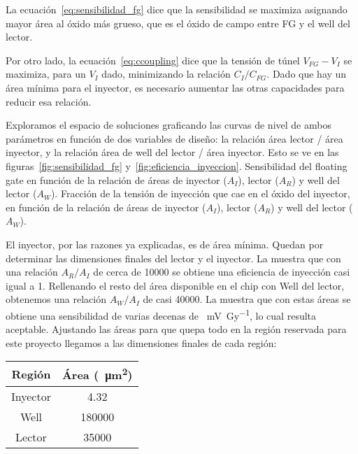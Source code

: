 La ecuación~\ref{eq:sensibilidad_fg} dice que la sensibilidad se maximiza
asignando mayor área al óxido más grueso,
que es el óxido de campo entre FG y el well del lector.

Por otro lado,
la ecuación~\ref{eq:ccoupling} dice que la tensión de túnel $V_{FG}-V_I$
se maximiza, para un $V_I$ dado,
minimizando la relación $C_I/C_{FG}$.
Dado que hay un área mínima para el inyector,
es necesario aumentar las otras capacidades para reducir esa relación.

Exploramos el espacio de soluciones
graficando las curvas de nivel de ambos parámetros en función de dos variables
de diseño:
la relación área lector / área inyector,
y la relación área de well del lector / área inyector.
Esto se ve en las figuras~\ref{fig:sensibilidad_fg}
y~\ref{fig:eficiencia_inyeccion}.
{Sensibilidad del floating gate en función de la relación de áreas de 
inyector ($A_I$),
lector ($A_R$) 
y well del lector ($A_W$).}
{Fracción de la tensión de inyección que cae en el óxido del inyector,
en función de la relación de áreas de 
inyector ($A_I$),
lector ($A_R$) 
y well del lector ($A_W$).}

El inyector, por las razones ya explicadas, es de área mínima.
Quedan por determinar las dimensiones finales del lector y el inyector.
La 
muestra que con una relación $A_R/A_I$ de cerca de 10000
se obtiene una eficiencia de inyección casi igual a 1.
Rellenando el resto del área disponible en el chip con Well del lector,
obtenemos una relación $A_W/A_I$ de casi 40000.
La  muestra que con estas áreas
se obtiene una sensibilidad de varias decenas de \SI{}{\milli\volt\per\gray},
lo cual resulta aceptable.
Ajustando las áreas para que quepa todo 
en la región reservada para este proyecto 
llegamos a las dimensiones finales de cada región:
\begin{table}[h]
\centering
\begin{tabular}{|c|c|}
    \hline
    Región   & Área (\SI{}{\micro\meter\squared})\\ \hline
Inyector & 4.32\\
Well     & 180000\\
Lector   & 35000\\
\hline
\end{tabular}
\end{table}
%
